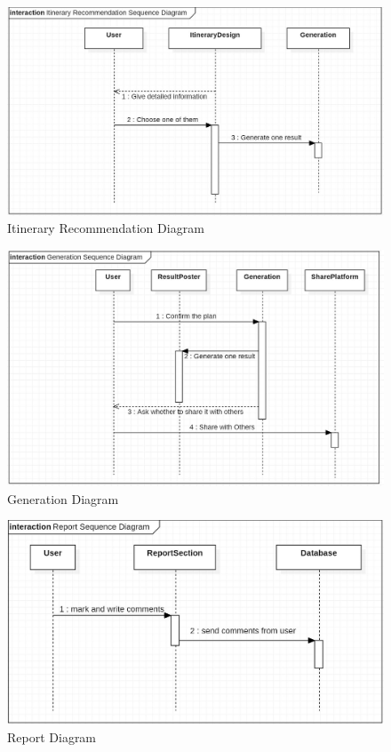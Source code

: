 \documentclass[10pt]{article}
\begin{document}
\begin{figure}[H]
	\centering
	\includegraphics[width=14cm]{itinerary.jpg} 
	\caption{Itinerary Recommendation Diagram}
	\label{Itinerary Recommendation Diagram}
\end{figure}

\begin{figure}[H]
	\centering
	\includegraphics[width=14cm]{generation.jpg} 
	\caption{Generation Diagram}
	\label{Generation Diagram}
\end{figure}

\begin{figure}[H]
	\centering
	\includegraphics[width=14cm]{report.jpg} 
	\caption{Report Diagram}
	\label{Report Diagram}
\end{figure}
\end{document}
